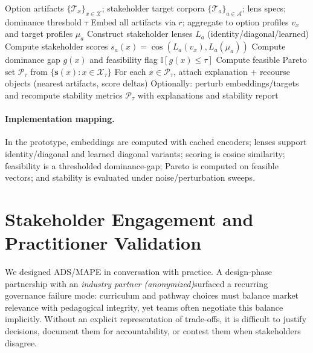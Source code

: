 \documentclass{article}
\newif\ifshort      %
\newif\ifdraft      %
\newcommand{\longonly}[1]{\ifshort\else #1\fi}
\newcommand{\draftonly}[1]{\ifdraft #1\fi}
\newcommand{\todo}[1]{\textcolor{red}{\textbf{[TODO: #1]}}}
\newcommand{\todo}[1]{}
\newcommand{\ADS}{\textsc{ADS}\xspace}
\newcommand{\MAPE}{\textsc{MAPE}\xspace}
\newcommand{\IndustryPartner}{\textit{industry partner (anonymized)}}
\begin{document}
\begin{algorithm}[t]
\caption{\MAPE in \ADS (prototype pipeline)}
\label{alg:mape}
\begin{algorithmic}[1]
\REQUIRE Option artifacts $\{\mathcal{T}_x\}_{x\in\mathcal{X}}$; stakeholder target corpora $\{\mathcal{T}_a\}_{a\in\mathcal{A}}$; lens specs; dominance threshold $\tau$
\STATE Embed all artifacts via $r$; aggregate to option profiles $v_x$ and target profiles $\mu_a$
\STATE Construct stakeholder lenses $L_a$ (identity/diagonal/learned)
  \STATE Compute stakeholder scores $s_a(x)=\cos(L_a(v_x),L_a(\mu_a))$
  \STATE Compute dominance gap $g(x)$ and feasibility flag $\mathbb{I}[g(x)\le\tau]$
\ENDFOR
\STATE Compute feasible Pareto set $\mathcal{P}_\tau$ from $\{\mathbf{s}(x): x\in\mathcal{X}_\tau\}$
\STATE For each $x\in\mathcal{P}_\tau$, attach explanation + recourse objects (nearest artifacts, score deltas)
\STATE Optionally: perturb embeddings/targets and recompute stability metrics
\RETURN $\mathcal{P}_\tau$ with explanations and stability report
\end{algorithmic}
\end{algorithm}

\longonly{\paragraph{Implementation mapping.} In the prototype, embeddings are computed with cached encoders; lenses support identity/diagonal and learned diagonal variants; scoring is cosine similarity; feasibility is a thresholded dominance-gap; Pareto is computed on feasible vectors; and stability is evaluated under noise/perturbation sweeps. \draftonly{\todo{Add concrete module paths once repo is frozen.}}}




\section{Stakeholder Engagement and Practitioner Validation}
\label{sec:collab}

We designed \ADS/\MAPE in conversation with practice. A design-phase partnership with an \IndustryPartner surfaced a recurring governance failure mode: curriculum and pathway choices must balance market relevance with pedagogical integrity, yet teams often negotiate this balance implicitly. Without an explicit representation of trade-offs, it is difficult to justify decisions, document them for accountability, or contest them when stakeholders disagree.
\end{document}
